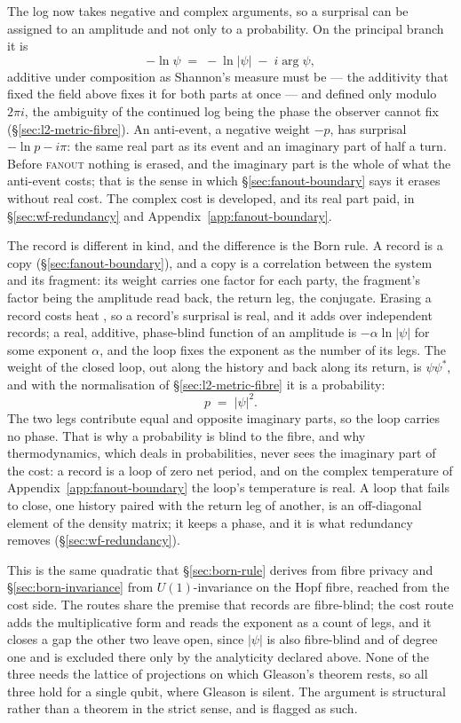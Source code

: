 The log now takes negative and complex arguments, so a surprisal can be assigned to an amplitude
and not only to a probability. On the principal branch it is
\[
-\ln\psi \;=\; -\ln|\psi| \;-\; i\arg\psi ,
\]
additive under composition as Shannon's measure must be --- the additivity that fixed the field
above fixes it for both parts at once --- and defined only modulo $2\pi i$, the ambiguity of the
continued log being the phase the observer cannot fix (\S\ref{sec:l2-metric-fibre}). An anti-event,
a negative weight $-p$, has surprisal $-\ln p - i\pi$: the same real part as its event and an
imaginary part of half a turn. Before \textsc{fanout} nothing is erased, and the imaginary part is
the whole of what the anti-event costs; that is the sense in which \S\ref{sec:fanout-boundary}
says it erases without real cost. The complex cost is developed, and its real part paid, in
\S\ref{sec:wf-redundancy} and Appendix~\ref{app:fanout-boundary}.

The record is different in kind, and the difference is the Born rule. A record is a copy
(\S\ref{sec:fanout-boundary}), and a copy is a correlation between the system and its fragment:
its weight carries one factor for each party, the fragment's factor being the amplitude read
back, the return leg, the conjugate. Erasing a record costs heat \autocite{Landauer_1961}, so a
record's surprisal is real, and it adds over independent records; a real, additive, phase-blind
function of an amplitude is $-\alpha\ln|\psi|$ for some exponent $\alpha$, and the loop fixes the
exponent as the number of its legs. The weight of the closed loop, out along the history and back
along its return, is $\psi\psi^{*}$, and with the normalisation of \S\ref{sec:l2-metric-fibre} it
is a probability:
\[
p \;=\; |\psi|^{2}.
\]
The two legs contribute equal and opposite imaginary parts, so the loop carries no phase. That is
why a probability is blind to the fibre, and why thermodynamics, which deals in probabilities,
never sees the imaginary part of the cost: a record is a loop of zero net period, and on the
complex temperature of Appendix~\ref{app:fanout-boundary} the loop's temperature is real. A loop
that fails to close, one history paired with the return leg of another, is an off-diagonal
element of the density matrix; it keeps a phase, and it is what redundancy removes
(\S\ref{sec:wf-redundancy}).

This is the same quadratic that \S\ref{sec:born-rule} derives from fibre privacy and
\S\ref{sec:born-invariance} from $U(1)$-invariance on the Hopf fibre, reached from the cost side.
The routes share the premise that records are fibre-blind; the cost route adds the multiplicative
form and reads the exponent as a count of legs, and it closes a gap the other two leave open,
since $|\psi|$ is also fibre-blind and of degree one and is excluded there only by the
analyticity declared above. None of the three needs the lattice of projections on which
Gleason's theorem rests, so all three hold for a single qubit, where Gleason is silent. The
argument is structural rather than a theorem in the strict sense, and is flagged as such.

